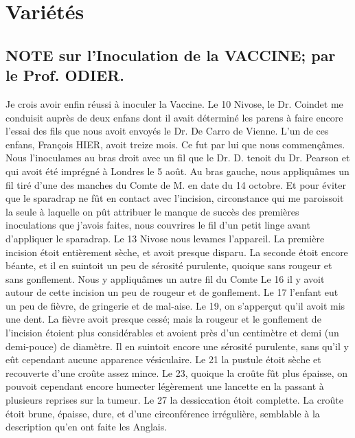 \setcounter{page}{112}
\chapter{Variétés}
\section{NOTE sur l'Inoculation de la VACCINE; par le Prof. ODIER.}
Je crois avoir enfin réussi à inoculer la Vaccine. Le 10 Nivose, le Dr. Coindet me conduisit auprès de deux enfans dont il avait déterminé les parens à faire encore l'essai des fils que nous avoit envoyés le Dr. De Carro de Vienne. L'un de ces enfans, François HIER, avoit treize mois. Ce fut par lui que nous commençâmes. Nous l'inoculames au bras droit avec un fil que le Dr. D. tenoit du Dr. Pearson et qui avoit été imprégné à Londres le 5 août. Au bras gauche, nous appliquâmes un fil tiré d'une des manches du Comte de M. en date du 14 octobre. Et pour éviter que le sparadrap ne fût en contact avec l'incision, circonstance qui me paroissoit la seule à laquelle on pût attribuer le manque de succès des premières inoculations que j'avois faites, nous couvrires le fil d'un petit linge avant d'appliquer le sparadrap. Le 13 Nivose nous levames l'appareil. La première incision étoit entièrement sèche, et avoit presque disparu. La seconde étoit encore béante, et il en suintoit un\setcounter{page}{113} peu de sérosité purulente, quoique sans rougeur et sans gonflement. Nous y appliquâmes un autre fil du Comte Le 16 il y avoit autour de cette incision un peu de rougeur et de gonflement. Le 17 l'enfant eut un peu de fièvre, de gringerie et de mal-aise. Le 19, on s'apperçut qu'il avoit mis une dent. La fièvre avoit presque cessé; mais la rougeur et le gonflement de l'incision étoient plus considérables et avoient près d'un centimètre et demi (un demi-pouce) de diamètre. Il en suintoit encore une sérosité purulente, sans qu'il y eût cependant aucune apparence vésiculaire. Le 21 la pustule étoit sèche et recouverte d'une croûte assez mince. Le 23, quoique la croûte fût plus épaisse, on pouvoit cependant encore humecter légèrement une lancette en la passant à plusieurs reprises sur la tumeur. Le 27 la dessiccation étoit complette. La croûte étoit brune, épaisse, dure, et d'une circonférence irrégulière, semblable à la description qu'en ont faite les Anglais.
